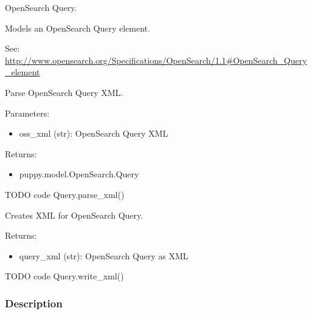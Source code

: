 \documentclass[letterpaper,10pt,english]{sphinxmanual}
\begin{document}
\begin{fulllineitems}
\label{api3.0:puppy.model.Query}
OpenSearch Query.

Models an OpenSearch Query element.

See: \href{http://www.opensearch.org/Specifications/OpenSearch/1.1\#OpenSearch\_Query\_element}{http://www.opensearch.org/Specifications/OpenSearch/1.1\#OpenSearch\_Query\_element}

\begin{fulllineitems}
\label{api3.0:puppy.model.Query.parse_xml}
Parse OpenSearch Query XML.

Parameters:
\begin{itemize}
\item {} 
oss\_xml (str): OpenSearch Query XML

\end{itemize}

Returns:
\begin{itemize}
\item {} 
puppy.model.OpenSearch.Query

\end{itemize}

TODO code Query.parse\_xml()

\end{fulllineitems}


\begin{fulllineitems}
\label{api3.0:puppy.model.Query.write_xml}
Creates XML for OpenSearch Query.

Returns:
\begin{itemize}
\item {} 
query\_xml (str): OpenSearch Query as XML

\end{itemize}

TODO code Query.write\_xml()

\end{fulllineitems}


\end{fulllineitems}



\subsubsection{Description}
\label{api3.0:description}
\end{document}
